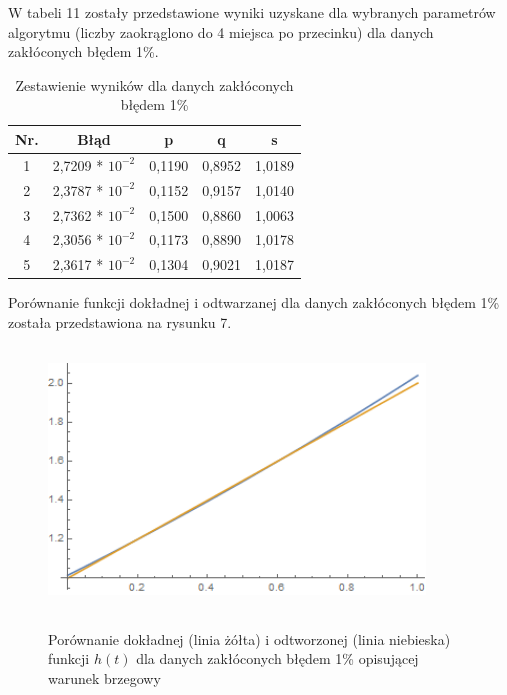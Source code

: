 \documentclass[twoside]{projektInzynierskiMS1}
\begin{document}
W tabeli 11 zostały przedstawione wyniki uzyskane dla wybranych parametrów algorytmu (liczby zaokrąglono do 4 miejsca po przecinku) dla danych zakłóconych błędem 1\%. \\

\begin{table}[htbp]\centering
\def\sym#1{\ifmmode^{#1}\else\(^{#1}\)\fi}
\caption{Zestawienie wyników dla danych zakłóconych błędem 1\%}
\renewcommand\arraystretch{1.333}
\begin{tabular}{|c|c|c|c|c|} 
                  \hline
\textbf{Nr.}& \textbf{Błąd} &\textbf{p} & \textbf{q} & \textbf{s}\\ \hline
1& 2,7209 * $10^{-2}$ & 0,1190 & 0,8952 & 1,0189 \\ \hline 
2& 2,3787 * $10^{-2}$ & 0,1152 & 0,9157 & 1,0140 \\ \hline 
3& 2,7362 * $10^{-2}$ & 0,1500 & 0,8860 & 1,0063 \\ \hline 
4& 2,3056 * $10^{-2}$ & 0,1173 & 0,8890 & 1,0178 \\ \hline 
5& 2,3617 * $10^{-2}$ & 0,1304 & 0,9021 & 1,0187 \\ \hline 
\end{tabular}
\end{table}

\noindent Porównanie funkcji dokładnej i odtwarzanej dla danych zakłóconych błędem 1\% została przedstawiona na rysunku 7. \\

\begin{figure}[H]
\begin{center}
		\includegraphics[height=7cm, width=10cm]{pics/1reconstruction.png}\\
	\caption{Porównanie dokładnej (linia żółta) i odtworzonej (linia niebieska) funkcji $h(t)$ dla danych zakłóconych błędem 1\% opisującej warunek brzegowy}
\end{center}
\end{figure}
\end{document}
